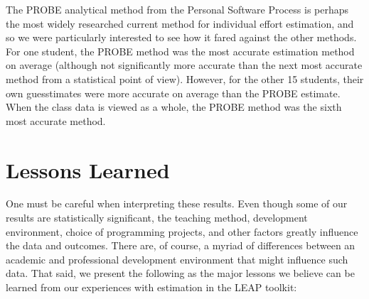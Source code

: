 The PROBE analytical method from the Personal Software Process is perhaps
the most widely researched current method for individual effort estimation,
and so we were particularly interested to see how it fared against the
other methods.  For one student, the PROBE method was the most accurate
estimation method on average (although not significantly more accurate than
the next most accurate method from a statistical point of view). However,
for the other 15 students, their own guesstimates were more accurate on
average than the PROBE estimate.  When the class data is viewed as a whole,
the PROBE method was the sixth most accurate method.

\section{Lessons Learned}

One must be careful when interpreting these results.  Even though some of
our results are statistically significant, the teaching method, development 
environment, choice of programming projects, and other factors 
greatly influence the data and outcomes.  There are, of course, a myriad of 
differences between an academic and professional development environment
that might influence such data. That said, we present the following as
the major lessons we believe can be learned from our experiences with
estimation in the LEAP toolkit:

